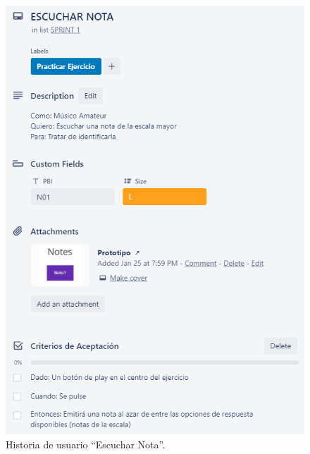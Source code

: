 \documentclass[12pt,twoside,titlepage]{report}
\begin{document}
{\begin{figure}[H]
    \centering
    \includegraphics[scale=1.3]{Scrum/User Stories/Notas}
    \caption{Historia de usuario ``Escuchar Nota''.}
    \label{fig:Notas}
\end{figure}

}
\end{document}
